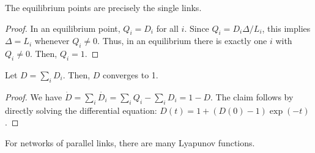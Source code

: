\documentclass[11pt,a4paper]{article}
\begin{document}
\begin{lemma} The equilibrium points are precisely the single links. \end{lemma}
\begin{proof} In an equilibrium point, $Q_i = D_i$ for all $i$. Since $Q_i =
D_i \Delta/L_i$, this implies $\Delta = L_i$ whenever $Q_i \not= 0$. Thus, in an
equilibrium there is exactly one $i$ with $Q_i \not= 0$. Then, $Q_i =
1$. \end{proof}

\begin{lemma}\label{lem:d-sum} 
Let $D=\sum_i D_i$. Then, $D$ converges to 1. 
\end{lemma}
\begin{proof}
We have 
$\dot{D} = \sum_i \dot{D_i} = \sum_i Q_i - \sum_i D_i = 1 - D.$ 
The claim follows by directly solving the differential equation: $D(t) = 1 + (D(0)-1) \exp(-t)$.  
\end{proof}

For networks of parallel links, there are many Lyapunov functions. 
\end{document}

